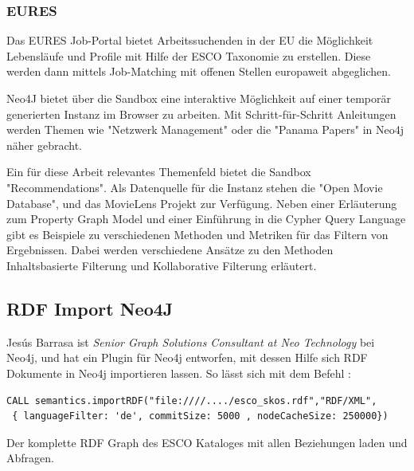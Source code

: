 \subsubsection{EURES}

Das EURES Job-Portal bietet Arbeitssuchenden in der EU die Möglichkeit Lebensläufe und Profile mit Hilfe der ESCO Taxonomie zu erstellen. Diese werden dann mittels Job-Matching mit offenen Stellen europaweit abgeglichen.\newline

Neo4J bietet über die Sandbox eine interaktive Möglichkeit auf einer temporär generierten Instanz im Browser zu arbeiten. Mit Schritt-für-Schritt Anleitungen werden Themen wie "Netzwerk Management" oder die "Panama Papers" in Neo4j näher gebracht.\newline

Ein für diese Arbeit relevantes Themenfeld bietet die Sandbox "Recommendations".\cite{neo4j} Als Datenquelle für die Instanz stehen die "Open Movie Database"\cite{omdb}, und das MovieLens Projekt\cite{grouplens_2016} zur Verfügung.
Neben einer Erläuterung zum Property Graph Model und einer Einführung in die Cypher Query Language gibt es Beispiele zu verschiedenen Methoden und Metriken für das Filtern von Ergebnissen. Dabei werden verschiedene Ansätze zu den Methoden Inhaltsbasierte Filterung und Kollaborative Filterung erläutert. 
\subsection{RDF Import Neo4J}

Jesús Barrasa ist  \textit{Senior Graph Solutions Consultant at Neo Technology} bei Neo4j, und hat ein Plugin für Neo4j entworfen, mit dessen Hilfe sich RDF Dokumente in Neo4j importieren lassen. So lässt sich mit dem Befehl :
\vspace{1em}

\begin{lstlisting}[frame=htrbl, caption={Das Listing zeigt einen Funktionsaufruf über die Neo4j}, label={lst:result2}]
CALL semantics.importRDF("file:////..../esco_skos.rdf","RDF/XML",
 { languageFilter: 'de', commitSize: 5000 , nodeCacheSize: 250000})	
\end{lstlisting}

Der komplette RDF Graph des ESCO Kataloges mit allen Beziehungen laden und Abfragen.


